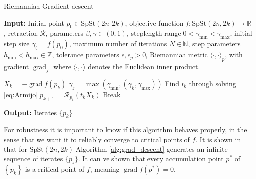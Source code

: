 \begin{algorithm}[H]
    \caption{Riemannian Gradient descent}\label{alg:grad_descent}
    \textbf{Input:} Initial point $p_{0}\in \mathrm{SpSt}(2n, 2k)$, objective function $f\colon\mathrm{SpSt}(2n, 2k)\to \mathbb{R}$, retraction $\mathcal{R}$, parameters $\beta, \gamma \in(0,1)$, steplength range $0<\gamma_{\text{min}}<\gamma_{\text{max}}$, initial step size $\gamma_{0}=f(p_{0})$, maximum number of iterations $N\in \mathbb{N}$, step parameters $h_{\text{min}}<h_{\text{max}}\in \mathbb{Z}$, tolerance parameters $\epsilon, \epsilon_{p}>0$, Riemannian metric $\langle \cdot,\cdot \rangle_{p}$, with gradient $\operatorname*{grad}_{f}$ where $\langle \cdot,\cdot \rangle$ denotes the Euclidean inner product.
    \begin{algorithmic}[1]
        \State $X_{k}=-\operatorname{grad}f(p_{k})$
        \State $\gamma_{k}=\operatorname{max}(\gamma_{\text{min}},(\gamma_{k}, \gamma_{\text{max}}))$
        \State Find $t_{k}$ through solving \eqref{eq:Armijo}
        \State $p_{k+1}=\mathcal{R}_{p_{k}}(t_{k}X_{k})$
        \State Break
        \EndIf
        \EndFor
    \end{algorithmic}
    \textbf{Output:} Iterates $\{p_{k}\}$
\end{algorithm}

For robustness it is important to know if this algorithm behaves properly, in the sense that we want it to reliably converge to critical points of $f$. It is shown in \cite[Cor.~5.8]{GaoSonAbsilStykel2021} that for $\mathrm{SpSt}(2n, 2k)$ Algorithm \ref{alg:grad_descent} generates an infinite sequence of iterates $\{p_{k}\}$\cite[Prop.~5.6]{GaoSonAbsilStykel2021}. It can ve shown that every accumulation point $p^*$ of $\left\{ p_{k} \right\}$ is a critical point of $f$, meaning $\operatorname{grad}f(p^{*})=0$. 